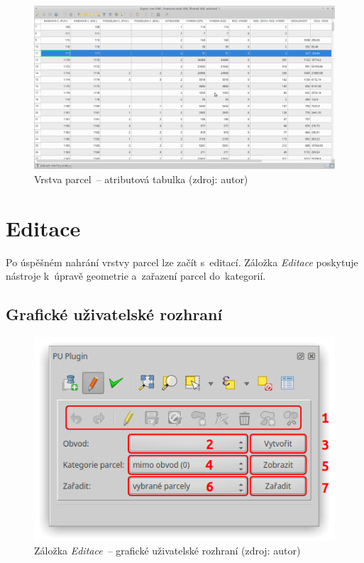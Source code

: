 	\begin{figure}[H] \centering
		\includegraphics[width=.95\textwidth]{./pictures/nacteni-tabulka.png}
		\caption[Vrstva parcel~– atributová tabulka]{Vrstva
parcel~– atributová tabulka (zdroj: autor)}
		\label{fig:manual_tabulka_par}
 	\end{figure}

\newpage

\section{Editace}
\label{manual_editace}

Po úspěšném nahrání vrstvy parcel lze začít s~editací. Záložka
\textit{Editace} poskytuje nástroje k~úpravě geometrie a~zařazení
parcel do~kategorií.

\subsection{Grafické uživatelské rozhraní}
\label{manual_editace_gui}

	\begin{figure}[H] \centering
		\includegraphics[width=.55\textwidth]{./pictures/editace_gui.png}
		\caption[Záložka \textit{Editace}~– grafické
uživatelské rozhraní]{Záložka \textit{Editace}~– grafické uživatelské
rozhraní (zdroj: autor)}
		\label{fig:manual_editace_gui}
 	\end{figure}

